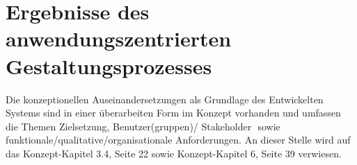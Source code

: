 
\section{Ergebnisse des anwendungszentrierten Gestaltungsprozesses}

Die konzeptionellen Auseinandersetzungen als Grundlage des Entwickelten Systems sind in einer überarbeiten Form im Konzept vorhanden und umfassen die Themen Zielsetzung, Benutzer(gruppen)/ Stakeholder  sowie funktionale/qualitative/organisationale Anforderungen. An dieser Stelle wird auf das Konzept-Kapitel 3.4, Seite 22 sowie Konzept-Kapitel 6, Seite 39 verwiesen.

%


%


%

\newpage

